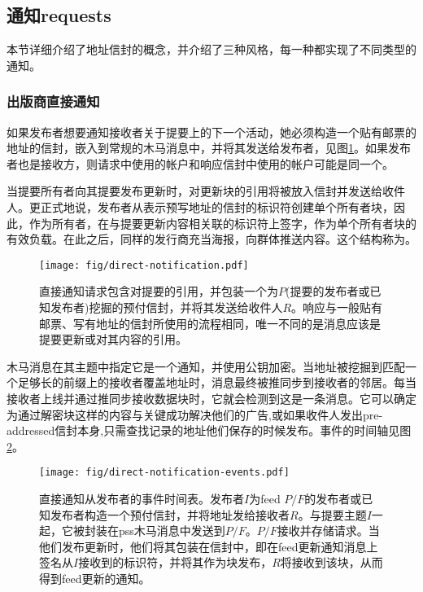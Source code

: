 \subsection{通知requests\statusgreen}\label{sec:notification-requests} 


本节详细介绍了地址信封的概念，并介绍了三种风格，每一种都实现了不同类型的通知。

\subsubsection{出版商直接通知}

如果发布者想要通知接收者关于提要上的下一个活动，她必须构造一个贴有邮票的地址的信封，嵌入到常规的木马消息中，并将其发送给发布者，见图\ref{fig:direct-notification}。如果发布者也是接收方，则请求中使用的帐户和响应信封中使用的帐户可能是同一个。


当提要所有者向其提要发布更新时，对更新块的引用将被放入信封并发送给收件人。更正式地说，发布者从表示预写地址的信封的标识符创建单个所有者块，因此，作为所有者，在与提要更新内容相关联的标识符上签字，作为单个所有者块的有效负载。在此之后，同样的发行商充当海报，向群体推送内容。这个结构称为。 

\begin{figure}[htbp]
   \centering
   \texttt{[image: fig/direct-notification.pdf]}
   \caption[直接通知请求和响应\statusgreen]{直接通知请求包含对提要的引用，并包装一个为$P$(提要的发布者或已知发布者)挖掘的预付信封，并将其发送给收件人$R$。响应与一般贴有邮票、写有地址的信封所使用的流程相同，唯一不同的是消息应该是提要更新或对其内容的引用。}
   \label{fig:direct-notification}
\end{figure}

木马消息在其主题中指定它是一个通知，并使用公钥加密。当地址被挖掘到匹配一个足够长的前缀上的接收者覆盖地址时，消息最终被推同步到接收者的邻居。每当接收者上线并通过推同步接收数据块时，它就会检测到这是一条消息。它可以确定为通过解密块这样的内容与关键成功解决他们的广告,或如果收件人发出pre-addressed信封本身,只需查找记录的地址他们保存的时候发布。事件的时间轴见图\ref{fig:direct-notification-events}。


\begin{figure}[htbp]
   \centering
    \texttt{[image: fig/direct-notification-events.pdf]}
   \caption[直接通知从发布者的事件时间表\statusgreen]{直接通知从发布者的事件时间表。发布者$I$为feed $P/F$的发布者或已知发布者构造一个预付信封，并将地址发给接收者$R$。与提要主题$I$一起，它被封装在pss木马消息中发送到$P/F$。$P/F$接收并存储请求。当他们发布更新时，他们将其包装在信封中，即在feed更新通知消息上签名从$I$接收到的标识符，并将其作为块发布，$R$将接收到该块，从而得到feed更新的通知。 }
   \label{fig:direct-notification-events}
\end{figure}


